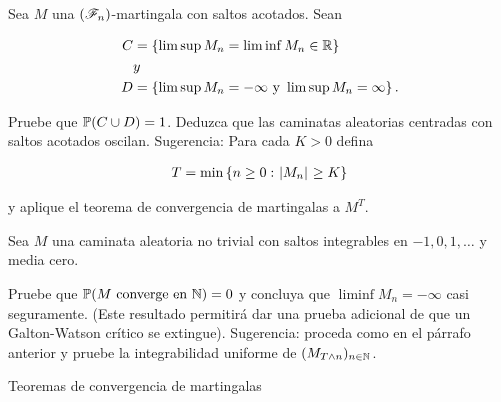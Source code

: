 \begin{problema}
Sea $M$ una $\left( \mathscr{F}_n\right) $-martingala con saltos acotados. Sean

\begin{align}
C   &=  \left\{ \limsup M_n=\liminf M_n\in\mathbb{R}\right\}                  \\
    &y                                                      \\
D   &=  \left\{ \limsup M_n=-\infty\text{ y }\limsup M_n=\infty\right\} .
\end{align}\par\null

Pruebe que $\mathbb{P}\! \left( C\cup D \right)=1$. Deduzca que las caminatas aleatorias centradas 
con saltos acotados oscilan. Sugerencia: Para cada $K>0$ defina

\begin{align}
T=\min\left\{ n\geq 0: \hspace{.25mm}\left|M_n\right|\hspace{.25mm}\geq K\right\} 
\end{align}

y aplique el teorema de convergencia de martingalas a $M^T$.\par\null

Sea $M$ una caminata aleatoria no trivial con saltos integrables en 
$-1,0,1,\ldots$ y  media cero.\par\null 

Pruebe que $\mathbb{P}\! \left( M\text{ converge en }\mathbb{N} \right)=0$ y  concluya que $\liminf M_n=-\infty$ 
casi seguramente. (Este resultado permitir\'a dar una prueba adicional de que un Galton-Watson cr\'itico se extingue).  
Sugerencia: proceda como en el párrafo anterior y pruebe la integrabilidad uniforme de $(M_{T\wedge n})_{n \in \mathbb{N}}$.

 Teoremas de convergencia de martingalas
\end{problema}